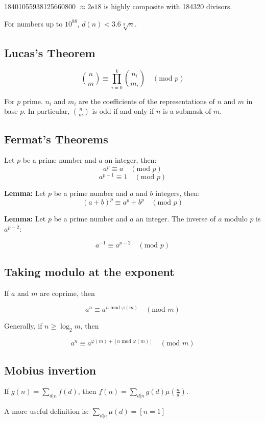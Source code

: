 18401055938125660800 $\approx 2\text{e}18$ is   highly composite with 184320 divisors.

For numbers up to $10^{88}$, $d(n) < 3.6 \sqrt[3]{n}$.

\subsection{Lucas's Theorem}

$$ \binom{n}{m} \equiv \prod_{i=0}^k \binom{n_i}{m_i} \quad (\text{mod } p) $$ 

For $p$ prime. $n_i$ and $m_i$ are the coefficients of the representations of $n$    and $m$ in base $p$. In particular, $\binom{n}{m}$ is odd if and only if $n$ is a submask of $m$.

\subsection{Fermat's Theorems}
Let $p$ be a prime number and $a$ an integer, then:
$$a^p \equiv a \quad (\text{mod } p)$$
$$a^{p-1} \equiv 1 \quad (\text{mod } p)$$

\textbf{Lemma:} Let $p$ be a prime number and $a$ and $b$ integers, then: 
$$(a+b)^{p} \equiv a^{p} + b^{p} \quad (\text{mod } p)$$

\textbf{Lemma:} Let $p$ be a prime number and $a$ an integer. The inverse of $a$ modulo $p$ is $a^{p-2}$:

$$a^{-1} \equiv a^{p-2} \quad (\text{mod } p)$$

\subsection{Taking modulo at the exponent}

If $a$ and $m$ are coprime, then

$$ a^n \equiv a^{n \text{ mod } \varphi(m)} \quad (\text{mod } m) $$

Generally, if $n \geq \log_2 m$, then

$$ a^n \equiv a^{\varphi(m) + [n \text{ mod } \varphi(m)]} \quad (\text{mod } m) $$

\subsection{Mobius invertion}

If $g(n) = \sum_{d|n} f(d)$, then $f(n) = \sum_{d|n} g(d) \mu(\frac{n}{d})$.

A more useful definition is: $\sum_{d|n} \mu(d) = [n = 1]$

